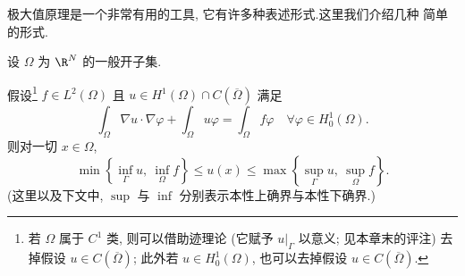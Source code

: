 极大值原理是一个非常有用的工具, 它有许多种表述形式.这里我们介绍几种
简单的形式.

设 $\Omega$ 为 $\R^N$ 的一般开子集.

\begin{keytheorem}
\label{thm:9.27}
假设\footnote{若 $\Omega$ 属于 $C^1$ 类, 则可以借助迹理论 (它赋予
$u|_\Gamma$ 以意义; 见本章末的评注) 去掉假设 $u\in C(\overline\Omega)$;
此外若 $u\in H_0^1(\Omega)$, 也可以去掉假设 $u\in C(\overline\Omega)$.}
$f\in L^2(\Omega)$ 且 $u\in H^1(\Omega)\cap C(\overline\Omega)$ 满足
\begin{equation}
\int_\Omega\nabla u\cdot\nabla\varphi+\int_\Omega u\varphi
=\int_\Omega f\varphi\quad\forall\varphi\in H_0^1(\Omega).
\label{eq:9.70}
\end{equation}
则对一切 $x\in\Omega$,
\begin{equation*}
\min\left\{\inf_\Gamma u,\ \inf_\Omega f\right\}\le u(x)
\le\max\left\{\sup_\Gamma u,\ \sup_\Omega f\right\}.
\end{equation*}
(这里以及下文中, $\sup$ 与 $\inf$ 分别表示本性上确界与本性下确界.)
\end{keytheorem}

